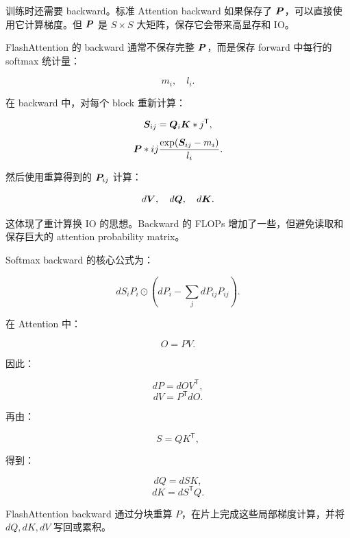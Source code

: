 训练时还需要 backward。标准 Attention backward 如果保存了 $\bm{P}$，可以直接使用它计算梯度。但 $\bm{P}$ 是 $S\times S$ 大矩阵，保存它会带来高显存和 IO。

FlashAttention 的 backward 通常不保存完整 $\bm{P}$，而是保存 forward 中每行的 softmax 统计量：

\[
m_i,\quad l_i.
\]

在 backward 中，对每个 block 重新计算：

\[
\bm{S}_{ij}=\bm{Q}_i\bm{K}*j^{\mathsf{T}},
\]
\[
\bm{P}*{ij}
\frac{\exp(\bm{S}_{ij}-m_i)}{l_i}.
\]

然后使用重算得到的 $\bm{P}_{ij}$ 计算：

\[
d\bm{V},
\quad
d\bm{Q},
\quad
d\bm{K}.
\]

这体现了重计算换 IO 的思想。Backward 的 FLOPs 增加了一些，但避免读取和保存巨大的 attention probability matrix。

Softmax backward 的核心公式为：

\[
dS_i
P_i
\odot
\left(
dP_i
-
\sum_j dP_{ij}P_{ij}
\right).
\]

在 Attention 中：

\[
O=PV.
\]

因此：

\[
dP=dO V^{\mathsf{T}},
\]
\[
dV=P^{\mathsf{T}}dO.
\]

再由：

\[
S=QK^{\mathsf{T}},
\]

得到：

\[
dQ=dS K,
\]
\[
dK=dS^{\mathsf{T}}Q.
\]

FlashAttention backward 通过分块重算 $P$，在片上完成这些局部梯度计算，并将 $dQ,dK,dV$ 写回或累积。

